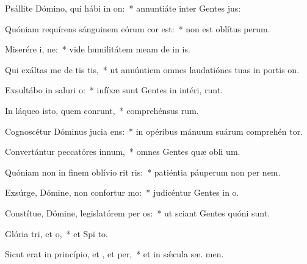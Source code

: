 \item Psállite Dómino, qui hábi in on:~* annuntiáte inter Gentes  jus:
\item Quóniam requírens sánguinem eórum cor est:~* non est oblítus  perum.
\item Miserére i, ne:~* vide humilitátem meam de in is.
\item Qui exáltas me de tis tis,~* ut annúntiem omnes laudatiónes tuas in portis  on.
\item Exsultábo in saluri o:~* infíxæ sunt Gentes in intéri,  runt.
\item In láqueo isto, quem conrunt,~* comprehénsus   rum.
\item Cognoscétur Dóminus jucia ens:~* in opéribus mánuum suárum comprehén  tor.
\item Convertántur peccatóres  innum,~* omnes Gentes quæ obli um.
\item Quóniam non in finem oblívio rit ris:~* patiéntia páuperum non per  nem.
\item Exsúrge, Dómine, non confortur mo:~* judicéntur Gentes in  o.
\item Constítue, Dómine, legislatórem per os:~* ut sciant Gentes quóni  sunt.
\item Glória tri, et o,~* et Spi to.
\item Sicut erat in princípio, et , et per,~* et in sǽcula sæ. men.
